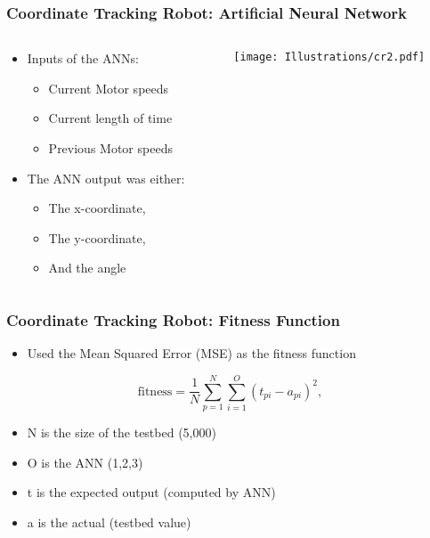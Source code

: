 \documentclass{beamer}
\begin{document}
\begin{frame}
  \frametitle{Coordinate Tracking Robot: Artificial Neural Network}
  \begin{columns}
  \begin{column}{0.5\textwidth}
\begin{itemize}
\item Inputs of the ANNs:
\begin{itemize}
\item Current Motor speeds
\item Current length of time
\item Previous Motor speeds
\end{itemize}
\item The ANN output was either:
\begin{itemize}
\item The x-coordinate,
\item The y-coordinate,
\item And the angle
\end{itemize}
\end{itemize}
\end{column}
\begin{column}{0.5\textwidth}
 \texttt{[image: Illustrations/cr2.pdf]}
       \\
\end{column}
\end{columns}
\end{frame}

\begin{frame}[fragile]
\frametitle{Coordinate Tracking Robot: Fitness Function}
\begin{itemize}
\item Used the Mean Squared Error (MSE) as the fitness function
\end{itemize}
  \[
  \textrm{fitness} = \frac{1}{N}\sum\limits_{p=1}^N\sum\limits_{i=1}^O (t_{pi} - a_{pi})^2,
\] 

\begin{itemize}
\item N is the size of the testbed (5,000) %
\item O is the ANN (1,2,3)
\item t is the expected output (computed by ANN)
\item a is the actual (testbed value)
\end{itemize}
\end{frame}
\end{document}
